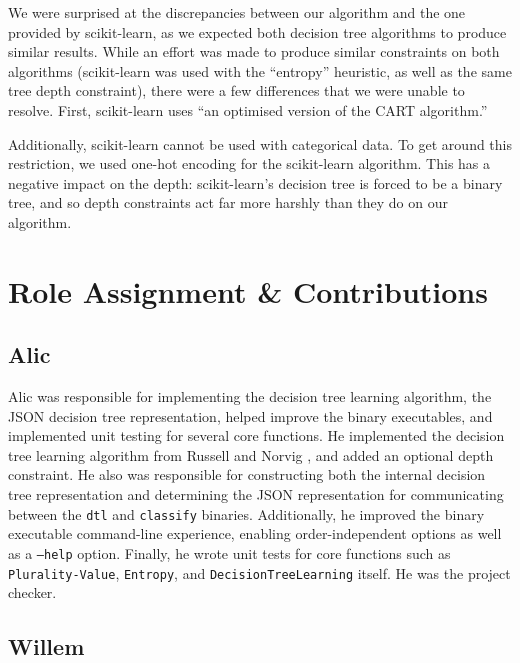 \documentclass[screen, authorversion, nonacm, sigconf]{acmart}
\begin{document}
We were surprised at the discrepancies between our algorithm and the one provided by scikit-learn, as we expected both decision tree algorithms to produce similar results. While an effort was made to produce similar constraints on both algorithms (scikit-learn was used with the ``entropy'' heuristic, as well as the same tree depth constraint), there were a few differences that we were unable to resolve. First, scikit-learn uses ``an optimised version of the CART \cite{DBLP:books/wa/BreimanFOS84} algorithm.''

Additionally, scikit-learn cannot be used with categorical data. To get around this restriction, we used one-hot encoding for the scikit-learn algorithm. This has a negative impact on the depth: scikit-learn's decision tree is forced to be a binary tree, and so depth constraints act far more harshly than they do on our algorithm.

\section{Role Assignment \& Contributions}

\subsection{Alic}

Alic was responsible for implementing the decision tree learning algorithm, the JSON decision tree representation, helped improve the binary executables, and implemented unit testing for several core functions. He implemented the decision tree learning algorithm from Russell and Norvig \cite{russell_norvig_2010}, and added an optional depth constraint. He also was responsible for constructing both the internal decision tree representation and determining the JSON representation for communicating between the \texttt{dtl} and \texttt{classify} binaries. Additionally, he improved the binary executable command-line experience, enabling order-independent options as well as a \texttt{--help} option. Finally, he wrote unit tests for core functions such as \texttt{Plurality-Value}, \texttt{Entropy}, and \texttt{DecisionTreeLearning} itself. He was the project checker.

\subsection{Willem}
\end{document}
